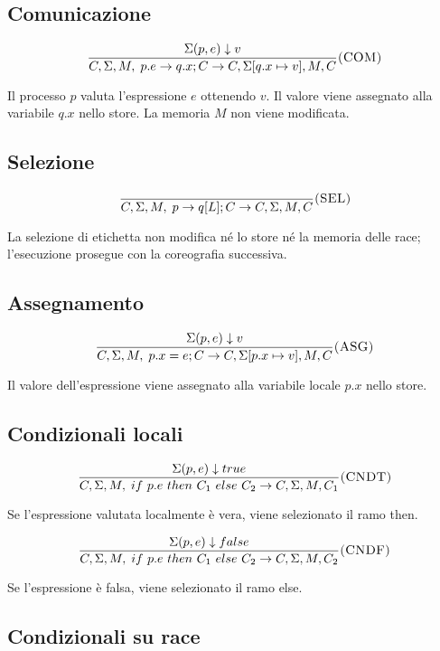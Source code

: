 \subsection*{Comunicazione}

\[
\frac{
\Sigma(p,e) \downarrow v
}{
C,\Sigma,M,\; p.e \rightarrow q.x ; C
\rightarrow
C,\Sigma[q.x \mapsto v],M,C
}
\rulelabel{COM}
\]

Il processo \(p\) valuta l’espressione \(e\) ottenendo \(v\). Il valore viene assegnato alla variabile \(q.x\) nello store. La memoria \(M\) non viene modificata.

\subsection*{Selezione}

\[
\frac{}{
C,\Sigma,M,\; p \rightarrow q[L] ; C
\rightarrow
C,\Sigma,M,C
}
\rulelabel{SEL}
\]

La selezione di etichetta non modifica né lo store né la memoria delle race; l’esecuzione prosegue con la coreografia successiva.

\subsection*{Assegnamento}

\[
\frac{
\Sigma(p,e) \downarrow v
}{
C,\Sigma,M,\; p.x = e ; C
\rightarrow
C,\Sigma[p.x \mapsto v],M,C
}
\rulelabel{ASG}
\]

Il valore dell’espressione viene assegnato alla variabile locale \(p.x\) nello store.

\subsection*{Condizionali locali}

\[
\frac{
\Sigma(p,e) \downarrow true
}{
C,\Sigma,M,\; if\ p.e\ then\ C_1\ else\ C_2
\rightarrow
C,\Sigma,M,C_1
}
\rulelabel{CNDT}
\]

Se l’espressione valutata localmente è vera, viene selezionato il ramo then.

\[
\frac{
\Sigma(p,e) \downarrow false
}{
C,\Sigma,M,\; if\ p.e\ then\ C_1\ else\ C_2
\rightarrow
C,\Sigma,M,C_2
}
\rulelabel{CNDF}
\]

Se l’espressione è falsa, viene selezionato il ramo else.

\subsection*{Condizionali su race}

